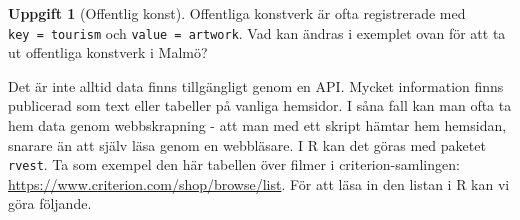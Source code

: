 \documentclass[
]{book}
\newenvironment{Shaded}{\begin{snugshade}}{\end{snugshade}}
\newcommand{\AttributeTok}[1]{\textcolor[rgb]{0.13,0.29,0.53}{#1}}
\newcommand{\DecValTok}[1]{\textcolor[rgb]{0.00,0.00,0.81}{#1}}
\newcommand{\FunctionTok}[1]{\textcolor[rgb]{0.13,0.29,0.53}{\textbf{#1}}}
\newcommand{\NormalTok}[1]{#1}
\newcommand{\OtherTok}[1]{\textcolor[rgb]{0.56,0.35,0.01}{#1}}
\newcommand{\SpecialCharTok}[1]{\textcolor[rgb]{0.81,0.36,0.00}{\textbf{#1}}}
\newcommand{\StringTok}[1]{\textcolor[rgb]{0.31,0.60,0.02}{#1}}
\theoremstyle{definition}
\theoremstyle{definition}
\theoremstyle{definition}
\newtheorem{exercise}{Uppgift}[chapter]
\theoremstyle{definition}
\theoremstyle{remark}
\begin{document}
\begin{Shaded}
\end{Shaded}

\begin{exercise}[Offentlig konst]
Offentliga konstverk är ofta registrerade med \texttt{key\ =\ \textquotesingle{}tourism\textquotesingle{}} och \texttt{value\ =\ \textquotesingle{}artwork\textquotesingle{}}. Vad kan ändras i exemplet ovan för att ta ut offentliga konstverk i Malmö?
\end{exercise}

Det är inte alltid data finns tillgängligt genom en API. Mycket information finns publicerad som text eller tabeller på vanliga hemsidor. I såna fall kan man ofta ta hem data genom webbskrapning - att man med ett skript hämtar hem hemsidan, snarare än att själv läsa genom en webbläsare. I R kan det göras med paketet \texttt{rvest}. Ta som exempel den här tabellen över filmer i criterion-samlingen: \url{https://www.criterion.com/shop/browse/list}. För att läsa in den listan i R kan vi göra följande.
\end{document}
